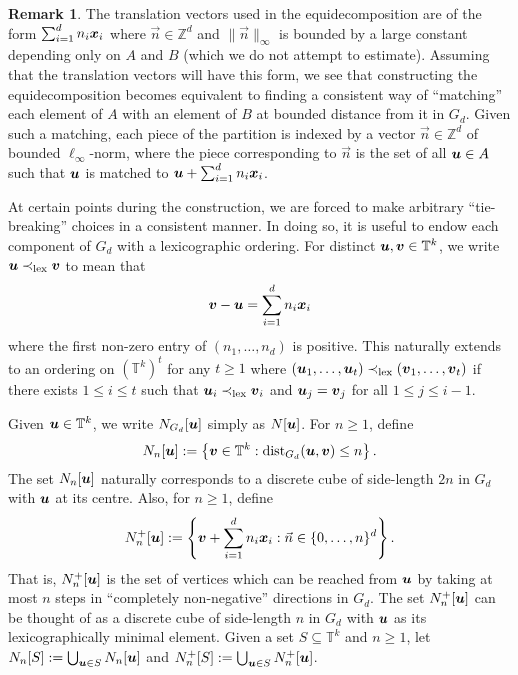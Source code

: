 \documentclass[12pt,a4paper]{amsart}
\numberwithin{equation}{section}
\theoremstyle{definition}
\newtheorem{remark}[equation]{Remark}
\begin{document}
\begin{remark}
\label{rem:GdRole}
The translation vectors used in the equidecomposition are of the form $\sum_{i=1}^dn_i\boldsymbol{x}_i$ where $\vec{n}\in \mathbb{Z}^d$ and $\|\vec{n}\|_\infty$ is bounded by a large constant depending only on $A$ and $B$ (which we do not attempt to estimate). Assuming that the translation vectors will have this form, we see that constructing the equidecomposition becomes equivalent to finding a consistent way of ``matching'' each element of $A$ with an element of $B$ at bounded distance from it in $G_d$. Given such a matching, each piece of the partition is indexed by a vector $\vec{n}\in \mathbb{Z}^d$ of bounded $\ell_\infty$-norm, where the piece corresponding to $\vec{n}$ is the set of all $\boldsymbol{u}\in A$ such that $\boldsymbol{u}$ is matched to $\boldsymbol{u}+\sum_{i=1}^dn_i\boldsymbol{x}_i$.  
\end{remark}

At certain points during the construction, we are forced to make arbitrary ``tie-breaking'' choices in a consistent manner. In doing so, it is useful to endow each component of $G_d$ with a lexicographic ordering. For distinct $\boldsymbol{u},\boldsymbol{v}\in \mathbb{T}^k$, we write $\boldsymbol{u}\prec_{\operatorname{lex}}\boldsymbol{v}$ to mean that 
\[\boldsymbol{v}-\boldsymbol{u} = \sum_{i=1}^dn_i\boldsymbol{x}_i\]
where the first non-zero entry of $(n_1,\dots,n_d)$ is positive. This naturally extends to an ordering on $\left(\mathbb{T}^k\right)^t$ for any $t\geq1$ where $(\boldsymbol{u}_1,\dots,\boldsymbol{u}_t)\prec_{\operatorname{lex}} (\boldsymbol{v}_1,\dots,\boldsymbol{v}_t)$ if there exists $1\leq i\leq t$ such that $\boldsymbol{u}_i\prec_{\operatorname{lex}} \boldsymbol{v}_i$ and $\boldsymbol{u}_j=\boldsymbol{v}_j$ for all $1\leq j\leq i-1$. 

Given $\boldsymbol{u}\in\mathbb{T}^k$, we write $N_{G_d}[\boldsymbol{u}]$ simply as $N[\boldsymbol{u}]$. For $n\geq1$, define
\[N_n[\boldsymbol{u}]:=\left\{\boldsymbol{v}\in \mathbb{T}^k: \operatorname{dist}_{G_d}(\boldsymbol{u},\boldsymbol{v})\leq n\right\}.\]
The set $N_n[\boldsymbol{u}]$ naturally corresponds to a discrete cube of side-length $2n$ in $G_d$ with $\boldsymbol{u}$ at its centre. Also, for $n\geq1$, define
\[N_n^+[\boldsymbol{u}]:=\left\{\boldsymbol{v}+ \sum_{i=1}^dn_i\boldsymbol{x}_i: \vec{n}\in\{0,\dots,n\}^d\right\}.\]
That is, $N_n^+[\boldsymbol{u}]$ is the set of vertices which can be reached from $\boldsymbol{u}$ by taking at most $n$ steps in ``completely non-negative'' directions in $G_d$. The set $N_n^+[\boldsymbol{u}]$ can be thought of as a discrete cube of side-length $n$ in $G_d$ with $\boldsymbol{u}$ as its lexicographically minimal element. Given a set $S\subseteq\mathbb{T}^k$ and $n\geq1$, let $N_n[S]:=\bigcup_{\boldsymbol{u}\in S}N_n[\boldsymbol{u}]$ and $N_n^+[S]:=\bigcup_{\boldsymbol{u}\in S}N_n^+[\boldsymbol{u}]$. 
\end{document}
